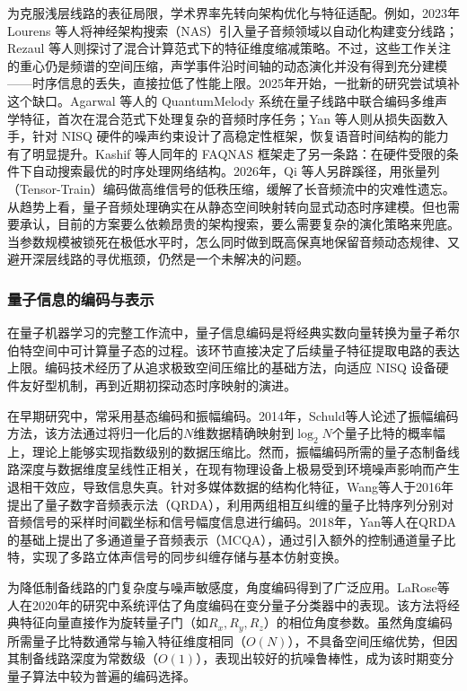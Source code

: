 为克服浅层线路的表征局限，学术界率先转向架构优化与特征适配。例如，2023年 Lourens 等人将神经架构搜索（NAS）引入量子音频领域以自动化构建变分线路；Rezaul 等人则探讨了混合计算范式下的特征维度缩减策略。不过，这些工作关注的重心仍是频谱的空间压缩，声学事件沿时间轴的动态演化并没有得到充分建模——时序信息的丢失，直接拉低了性能上限。2025年开始，一批新的研究尝试填补这个缺口。Agarwal 等人的 QuantumMelody 系统在量子线路中联合编码多维声学特征，首次在混合范式下处理复杂的音频时序任务；Yan 等人则从损失函数入手，针对 NISQ 硬件的噪声约束设计了高稳定性框架，恢复语音时间结构的能力有了明显提升。Kashif 等人同年的 FAQNAS 框架走了另一条路：在硬件受限的条件下自动搜索最优的时序处理网络结构。2026年，Qi 等人另辟蹊径，用张量列（Tensor-Train）编码做高维信号的低秩压缩，缓解了长音频流中的灾难性遗忘。从趋势上看，量子音频处理确实在从静态空间映射转向显式动态时序建模。但也需要承认，目前的方案要么依赖昂贵的架构搜索，要么需要复杂的演化策略来兜底。当参数规模被锁死在极低水平时，怎么同时做到既高保真地保留音频动态规律、又避开深层线路的寻优瓶颈，仍然是一个未解决的问题。

\subsubsection{量子信息的编码与表示}

在量子机器学习的完整工作流中，量子信息编码是将经典实数向量转换为量子希尔伯特空间中可计算量子态的过程。该环节直接决定了后续量子特征提取电路的表达上限。编码技术经历了从追求极致空间压缩比的基础方法，向适应 NISQ 设备硬件友好型机制，再到近期初探动态时序映射的演进。

在早期研究中，常采用基态编码和振幅编码。2014年，Schuld等人论述了振幅编码方法，该方法通过将归一化后的$N$维数据精确映射到$\log_2 N$个量子比特的概率幅上，理论上能够实现指数级别的数据压缩比。然而，振幅编码所需的量子态制备线路深度与数据维度呈线性正相关，在现有物理设备上极易受到环境噪声影响而产生退相干效应，导致信息失真。针对多媒体数据的结构化特征，Wang等人于2016年提出了量子数字音频表示法（QRDA），利用两组相互纠缠的量子比特序列分别对音频信号的采样时间戳坐标和信号幅度信息进行编码。2018年，Yan等人在QRDA的基础上提出了多通道量子音频表示（MCQA），通过引入额外的控制通道量子比特，实现了多路立体声信号的同步纠缠存储与基本仿射变换。

为降低制备线路的门复杂度与噪声敏感度，角度编码得到了广泛应用。LaRose等人在2020年的研究中系统评估了角度编码在变分量子分类器中的表现。该方法将经典特征向量直接作为旋转量子门（如$R_x, R_y, R_z$）的相位角度参数。虽然角度编码所需量子比特数通常与输入特征维度相同（$O(N)$），不具备空间压缩优势，但因其制备线路深度为常数级（$O(1)$），表现出较好的抗噪鲁棒性，成为该时期变分量子算法中较为普遍的编码选择。

